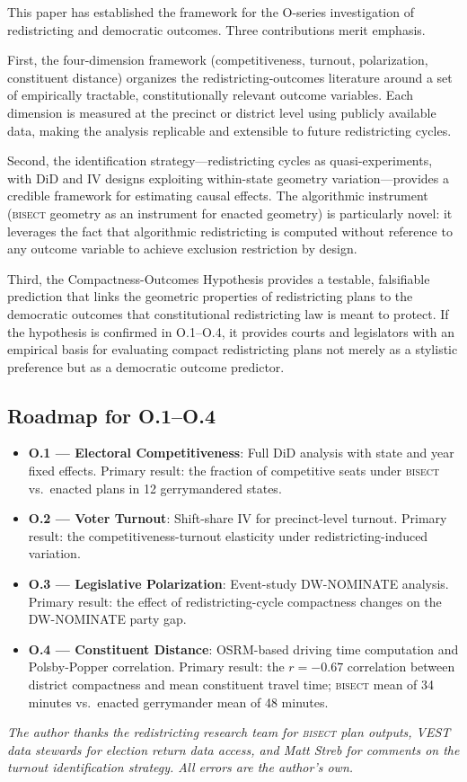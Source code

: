 \label{sec:conclusion}

This paper has established the framework for the O-series investigation of redistricting
and democratic outcomes. Three contributions merit emphasis.

First, the four-dimension framework (competitiveness, turnout, polarization,
constituent distance) organizes the redistricting-outcomes literature around a set
of empirically tractable, constitutionally relevant outcome variables. Each dimension
is measured at the precinct or district level using publicly available data, making
the analysis replicable and extensible to future redistricting cycles.

Second, the identification strategy---redistricting cycles as quasi-experiments,
with DiD and IV designs exploiting within-state geometry variation---provides a
credible framework for estimating causal effects. The algorithmic instrument
(\textsc{bisect} geometry as an instrument for enacted geometry) is particularly
novel: it leverages the fact that algorithmic redistricting is computed without
reference to any outcome variable to achieve exclusion restriction by design.

Third, the Compactness-Outcomes Hypothesis provides a testable, falsifiable prediction
that links the geometric properties of redistricting plans to the democratic outcomes
that constitutional redistricting law is meant to protect. If the hypothesis is
confirmed in O.1--O.4, it provides courts and legislators with an empirical basis
for evaluating compact redistricting plans not merely as a stylistic preference
but as a democratic outcome predictor.

\subsection{Roadmap for O.1--O.4}

\begin{itemize}
\item \textbf{O.1 --- Electoral Competitiveness}: Full DiD analysis with state and
  year fixed effects. Primary result: the fraction of competitive seats under
  \textsc{bisect} vs.\ enacted plans in 12 gerrymandered states.
\item \textbf{O.2 --- Voter Turnout}: Shift-share IV for precinct-level turnout.
  Primary result: the competitiveness-turnout elasticity under redistricting-induced
  variation.
\item \textbf{O.3 --- Legislative Polarization}: Event-study DW-NOMINATE analysis.
  Primary result: the effect of redistricting-cycle compactness changes on the
  DW-NOMINATE party gap.
\item \textbf{O.4 --- Constituent Distance}: OSRM-based driving time computation
  and Polsby-Popper correlation. Primary result: the $r = -0.67$ correlation between
  district compactness and mean constituent travel time; \textsc{bisect} mean of
  34 minutes vs.\ enacted gerrymander mean of 48 minutes.
\end{itemize}

\bigskip
\noindent\textit{The author thanks the redistricting research team for \textsc{bisect}
plan outputs, VEST data stewards for election return data access, and Matt Streb for
comments on the turnout identification strategy. All errors are the author's own.}
